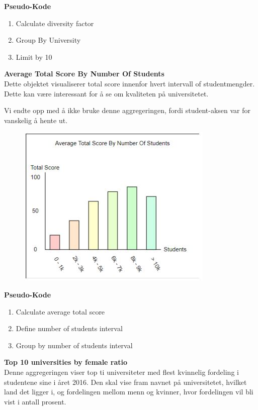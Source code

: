 \textbf{Pseudo-Kode}
\begin{enumerate}
  \item Calculate diversity factor
  \item Group By University
  \item Limit by 10
\end{enumerate}

\pagebreak
\textbf{Average Total Score By Number Of Students}\\
Dette objektet visualiserer total score innenfor hvert intervall of studentmengder. Dette kan være 
interessant for å se om kvaliteten på universitetet.

Vi endte opp med å ikke bruke denne aggregeringen, fordi student-aksen var for vanskelig å hente ut.

\FigureCounter
\begin{figure}[H]
  \includegraphics[scale=1]{images/milepael4/averageScoreByStudents.JPG}
\end{figure}

\textbf{Pseudo-Kode}
\begin{enumerate}
  \item Calculate average total score
  \item Define number of students interval
  \item Group by number of students interval
\end{enumerate}

\pagebreak
\textbf{Top 10 universities by female ratio}\\
Denne aggregeringen viser top ti universiteter med flest kvinnelig fordeling i studentene sine i året 2016. Den skal vise fram navnet på universitetet, hvilket land det ligger i, og fordelingen mellom menn og kvinner, hvor fordelingen vil bli vist i antall prosent.


